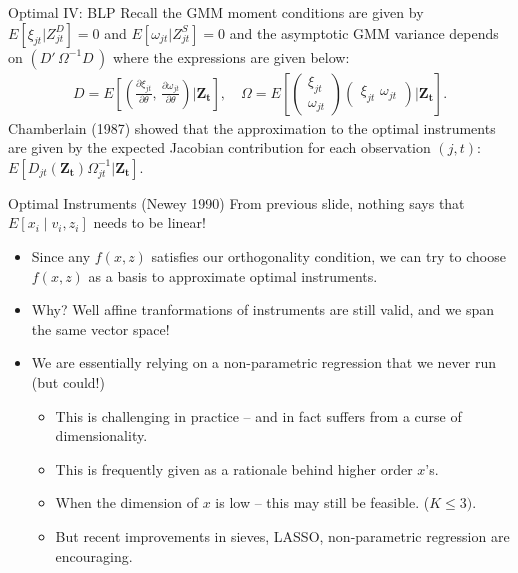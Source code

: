 \documentclass[xcolor=pdftex,dvipsnames,table,mathserif,aspectratio=169]{beamer}
\begin{document}
\begin{frame}{Optimal IV: BLP}
Recall the GMM moment conditions are given by $E[\xi_{jt} | Z_{jt}^D]=0$ and $E[\omega_{jt} | Z_{jt}^S]=0$ and the asymptotic GMM variance depends on $(D'\, \Omega^{-1} D\,)$ where the expressions are given below:
\begin{align*}
    D=E\left[
    \left(\frac{\partial \xi_{jt}}{\partial \theta}, \,
    \frac{\partial \omega_{jt}}{\partial \theta} \right)
| \mathbf{Z_t} \right], \quad 
\Omega = E\left[
\begin{pmatrix}
    \xi_{jt} \\
    \omega_{jt}
\end{pmatrix}
\begin{pmatrix}
    \xi_{jt}\, \,
    \omega_{jt}
\end{pmatrix}
| \mathbf{Z_t} \right].
\end{align*}
Chamberlain (1987) showed that the approximation to the optimal instruments are given by the expected Jacobian contribution for each observation $(j,t)$: $E[D_{jt}(\mathbf{Z_t}) \Omega_{jt}^{-1} | \mathbf{Z_t}]$.
\end{frame}

\begin{frame}{Optimal Instruments (Newey 1990)}
From previous slide, nothing says that $E\left[x_i \mid v_i, z_i \right]$ needs to be \alert{linear}!
\begin{itemize}
\item Since any $f(x,z)$ satisfies our orthogonality condition, we can try to choose $f(x,z)$ as a \alert{basis} to approximate optimal instruments.
\item Why? Well affine tranformations of instruments are still valid, and we span the same vector space!
\item We are essentially relying on a non-parametric regression that we never run (but could!)
\begin{itemize}
\item This is challenging in practice -- and in fact suffers from a curse of dimensionality.
\item This is frequently given as a rationale behind higher order $x$'s.
\item When the dimension of $x$ is low -- this may still be feasible. ($K \leq 3)$.
\item But recent improvements in sieves, LASSO, non-parametric regression are encouraging.
\end{itemize}
\end{itemize}
\end{frame}
\end{document}
